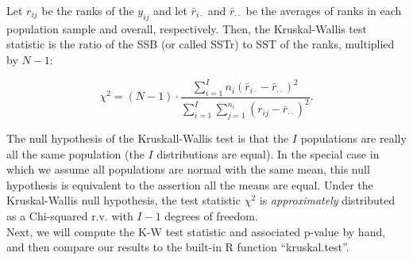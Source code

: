 \documentclass[
]{book}
\newenvironment{Shaded}{\begin{snugshade}}{\end{snugshade}}
\newcommand{\CommentTok}[1]{\textcolor[rgb]{0.56,0.35,0.01}{\textit{#1}}}
\newcommand{\DecValTok}[1]{\textcolor[rgb]{0.00,0.00,0.81}{#1}}
\newcommand{\FunctionTok}[1]{\textcolor[rgb]{0.00,0.00,0.00}{#1}}
\newcommand{\NormalTok}[1]{#1}
\newcommand{\OtherTok}[1]{\textcolor[rgb]{0.56,0.35,0.01}{#1}}
\newcommand{\SpecialCharTok}[1]{\textcolor[rgb]{0.00,0.00,0.00}{#1}}
\begin{document}
Let \(r_{ij}\) be the ranks of the \(y_{ij}\) and let \(\bar r_{i\cdot}\) and \(\bar r_{\cdot\cdot}\) be the averages of ranks in each population sample and overall, respectively. Then, the Kruskal-Wallis test statistic is the ratio of the SSB (or called SSTr) to SST of the ranks, multiplied by \(N-1\):

\[\chi^2 = (N-1) \cdot \frac{\sum_{i=1}^I n_{i}(\bar r_{i\cdot} - \bar r_{\cdot\cdot})^2}{\sum_{i=1}^I\sum_{j=1}^{n_i}(r_{ij} - \bar r_{\cdot\cdot})^2}.\]

The null hypothesis of the Kruskall-Wallis test is that the \(I\) populations are really all the same population (the \(I\) distributions are equal). In the special case in which we assume all populations are normal with the same mean, this null hypothesis is equivalent to the assertion all the means are equal. Under the Kruskal-Wallis null hypothesis, the test statistic \(\chi^2\) is \emph{approximately} distributed as a Chi-squared r.v. with \(I-1\) degrees of freedom.\\

Next, we will compute the K-W test statistic and associated p-value by hand, and then compare our results to the built-in R function ``kruskal.test''.

\begin{Shaded}
\end{Shaded}
\end{document}
